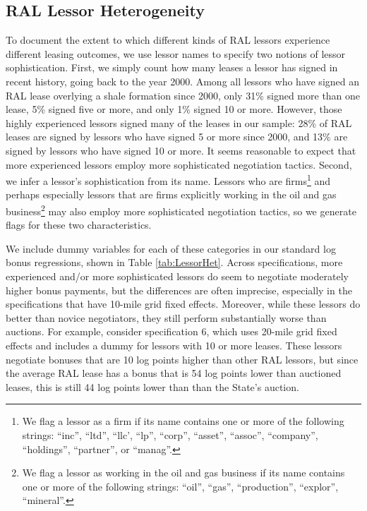 \begin{appendices}
\subsection{RAL Lessor Heterogeneity}\label{app:lessor_hetero}
To document the extent to which different kinds of RAL lessors experience different leasing outcomes, we use lessor names to specify two notions of lessor sophistication.  First, we simply count how many leases a lessor has signed in recent history, going back to the year 2000.  Among all lessors who have signed an RAL lease overlying a shale formation since 2000, only 31\% signed more than one lease, 5\% signed five or more, and only 1\% signed 10 or more.  However, those highly experienced lessors signed many of the leases in our sample: 28\% of RAL leases are signed by lessors who have signed 5 or more since 2000, and 13\% are signed by lessors who have signed 10 or more.  It seems reasonable to expect that more experienced lessors employ more sophisticated negotiation tactics.  Second, we infer a lessor's sophistication from its name.  Lessors who are firms\footnote{We flag a lessor as a firm if its name contains one or more of the following strings: ``inc'', ``ltd'', ``llc', ``lp'', ``corp'', ``asset'', ``assoc'', ``company'', ``holdings'', ``partner'', or ``manag''.} and perhaps especially lessors that are firms explicitly working in the oil and gas business\footnote{We flag a lessor as working in the oil and gas business if its name contains one or more of the following strings: ``oil'', ``gas'', ``production'', ``explor'', ``mineral''.} may also employ more sophisticated negotiation tactics, so we generate flags for these two characteristics.  

We include dummy variables for each of these categories in our standard log bonus regressions, shown in Table \ref{tab:LessorHet}.  Across specifications, more experienced and/or more sophisticated lessors do seem to negotiate moderately higher bonus payments, but the differences are often imprecise, especially in the specifications that have 10-mile grid fixed effects. Moreover, while these lessors do better than novice negotiators, they still perform substantially worse than auctions. For example, consider specification 6, which uses 20-mile grid fixed effects and includes a dummy for lessors with 10 or more leases.  These lessors negotiate bonuses that are 10 log points higher than other RAL lessors, but since the average RAL lease has a bonus that is 54 log points lower than auctioned leases, this is still 44 log points lower than than the State's auction.


\end{appendices}
